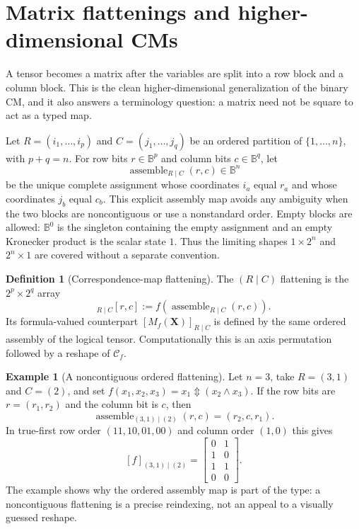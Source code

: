 \documentclass[11pt]{article}
\theoremstyle{definition}
\newtheorem{definition}[theorem]{Definition}
\newtheorem{example}[theorem]{Example}
\theoremstyle{remark}
\newcommand{\B}{\mathbb B}
\newcommand{\cC}{\mathcal C}
\newcommand{\xor}{\mathbin{\Updownarrow}}
\begin{document}
\section{Matrix flattenings and higher-dimensional CMs}
\label{sec:flatten}

A tensor becomes a matrix after the variables are split into a row block and a column block.  This is the clean higher-dimensional generalization of the binary CM, and it also answers a terminology question: a matrix need not be square to act as a typed map.

Let $R=(i_1,\ldots,i_p)$ and $C=(j_1,\ldots,j_q)$ be an ordered partition of $\{1,\ldots,n\}$, with $p+q=n$.  For row bits $r\in\B^p$ and column bits $c\in\B^q$, let
\[
 \operatorname{assemble}_{R\mid C}(r,c)\in\B^n
\]
be the unique complete assignment whose coordinates $i_a$ equal $r_a$ and whose coordinates $j_b$ equal $c_b$.  This explicit assembly map avoids any ambiguity when the two blocks are noncontiguous or use a nonstandard order.  Empty blocks are allowed: $\B^0$ is the singleton containing the empty assignment and an empty Kronecker product is the scalar state $1$.  Thus the limiting shapes $1\times2^n$ and $2^n\times1$ are covered without a separate convention.

\begin{definition}[Correspondence-map flattening]
The $(R\mid C)$ flattening is the $2^p\times2^q$ array
\begin{equation}
 [f]_{R\mid C}[r,c]
 :=f\!\left(\operatorname{assemble}_{R\mid C}(r,c)\right).
 \label{eq:flattening}
\end{equation}
Its formula-valued counterpart $[M_f(\mathbf X)]_{R\mid C}$ is defined by the same ordered assembly of the logical tensor.  Computationally this is an axis permutation followed by a reshape of $\cC_f$.
\end{definition}

\begin{example}[A noncontiguous ordered flattening]
Let $n=3$, take $R=(3,1)$ and $C=(2)$, and set
$f(x_1,x_2,x_3)=x_1\xor(x_2\land x_3)$.  If the row bits are $r=(r_1,r_2)$ and the column bit is $c$, then
\[
 \operatorname{assemble}_{(3,1)\mid(2)}(r,c)=(r_2,c,r_1).
\]
In true-first row order $(11,10,01,00)$ and column order $(1,0)$ this gives
\[
 [f]_{(3,1)\mid(2)}=
 \begin{bmatrix}
 0&1\\
 1&0\\
 1&1\\
 0&0
 \end{bmatrix}.
\]
The example shows why the ordered assembly map is part of the type: a noncontiguous flattening is a precise reindexing, not an appeal to a visually guessed reshape.
\end{example}
\end{document}

